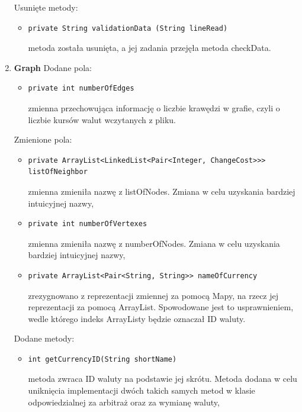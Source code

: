 \documentclass[12pt]{article}
\begin{document}
\begin{enumerate}
    Usunięte metody:
    \begin{itemize}
        \item \begin{verbatim}private String validationData (String lineRead)\end{verbatim}
        metoda została usunięta, a jej zadania przejęła metoda checkData.
    \end{itemize}
\item \textbf{Graph}
\newline\newline
   Dodane pola:
   \begin{itemize}
        \item \begin{verbatim}private int numberOfEdges\end{verbatim}
        zmienna przechowująca informację o liczbie krawędzi w grafie, czyli o liczbie kursów walut wczytanych z pliku.
    \end{itemize}
   Zmienione pola:
    \begin{itemize}
        \item \begin{verbatim}private ArrayList<LinkedList<Pair<Integer, ChangeCost>>> listOfNeighbor\end{verbatim}
        zmienna zmieniła nazwę z listOfNodes. Zmiana w celu uzyskania bardziej intuicyjnej nazwy,
    \item \begin{verbatim}private int numberOfVertexes\end{verbatim}
        zmienna zmieniła nazwę z numberOfNodes. Zmiana w celu uzyskania bardziej intuicyjnej nazwy,
    \item \begin{verbatim}private ArrayList<Pair<String, String>> nameOfCurrency\end{verbatim}
        zrezygnowano z reprezentacji zmiennej za pomocą Mapy, na rzecz jej reprezentacji za pomocą ArrayList. Spowodowane jest to usprawnieniem, wedle którego indeks ArrayListy będzie oznaczał ID waluty.
    \end{itemize}
    Dodane metody:
    \begin{itemize}
        \item \begin{verbatim}int getCurrencyID(String shortName)\end{verbatim}
        metoda zwraca ID waluty na podstawie jej skrótu. Metoda dodana w celu uniknięcia implementacji dwóch takich samych metod w klasie odpowiedzialnej za arbitraż oraz za wymianę waluty,

\end{itemize}
\end{enumerate}
\end{document}
